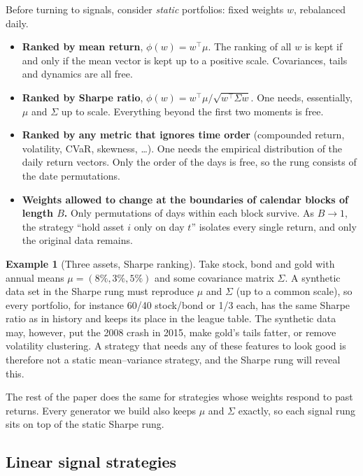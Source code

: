\documentclass[11pt]{article}
\theoremstyle{definition}
\newtheorem{example}{Example}
\theoremstyle{remark}
\begin{document}
Before turning to signals, consider \emph{static} portfolios: fixed weights $w$, rebalanced daily.
\begin{itemize}[leftmargin=*,itemsep=2pt]
  \item \textbf{Ranked by mean return}, $\phi(w)=w^\top\mu$. The ranking of all $w$ is kept if and only if the mean vector
  is kept up to a positive scale. Covariances, tails and dynamics are all free.
  \item \textbf{Ranked by Sharpe ratio}, $\phi(w)=w^\top\mu/\sqrt{w^\top\Sigma w}$. One needs, essentially, $\mu$ and
  $\Sigma$ up to scale. Everything beyond the first two moments is free.
  \item \textbf{Ranked by any metric that ignores time order} (compounded return, volatility, CVaR, skewness, \dots). One needs
  the empirical distribution of the daily return vectors. Only the order of the days is free, so the rung consists of the
  date permutations.
  \item \textbf{Weights allowed to change at the boundaries of calendar blocks of length $B$.} Only permutations of days within each
  block survive. As $B\to 1$, the strategy ``hold asset $i$ only on day $t$'' isolates every single return, and only the
  original data remains.
\end{itemize}

\begin{example}[Three assets, Sharpe ranking]
Take stock, bond and gold with annual means $\mu=(8\%,3\%,5\%)$ and some covariance matrix $\Sigma$. A synthetic data set in
the Sharpe rung must reproduce $\mu$ and $\Sigma$ (up to a common scale), so every portfolio, for instance 60/40 stock/bond or
1/3 each, has the same Sharpe ratio as in history and keeps its place in the league table. The synthetic data may, however, put
the 2008 crash in 2015, make gold's tails fatter, or remove volatility clustering. A strategy that needs any of these
features to look good is therefore not a static mean--variance strategy, and the Sharpe rung will reveal this.
\end{example}

The rest of the paper does the same for strategies whose weights respond to past returns. Every generator we build
also keeps $\mu$ and $\Sigma$ exactly, so each signal rung sits on top of the static Sharpe rung.

\subsection{Linear signal strategies}
\end{document}
